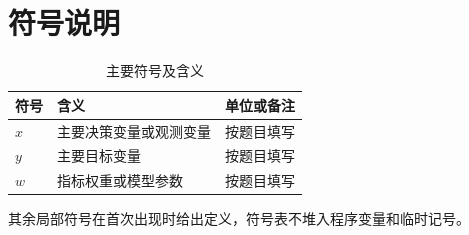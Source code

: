 \section{符号说明}

\begin{table}[H]
\centering
\caption{主要符号及含义}
\begin{tabular}{lll}
\toprule
符号 & 含义 & 单位或备注\\
\midrule
$x$ & 主要决策变量或观测变量 & 按题目填写\\
$y$ & 主要目标变量 & 按题目填写\\
$w$ & 指标权重或模型参数 & 按题目填写\\
\bottomrule
\end{tabular}
\end{table}

其余局部符号在首次出现时给出定义，符号表不堆入程序变量和临时记号。
